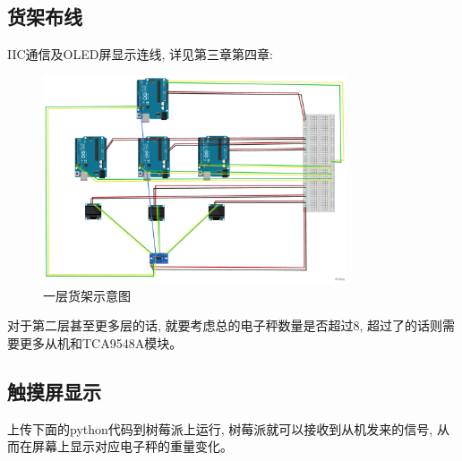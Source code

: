 \documentclass{article}
\begin{document}
\newpage
\subsection{货架布线}
IIC通信及OLED屏显示连线, 详见第三章第四章:
\begin{figure}[h]
  \centering
  \includegraphics[width=0.8\textwidth]{../4_Chapter4_COMMUNICATION/Picture/一层货架示意图.pdf}
  \caption{一层货架示意图}
  \label{fig:一层货架示意图}
\end{figure}

对于第二层甚至更多层的话, 就要考虑总的电子秤数量是否超过8, 超过了的话则需要更多从机和TCA9548A模块。

\subsection{触摸屏显示}
上传下面的python代码到树莓派上运行, 树莓派就可以接收到从机发来的信号, 从而在屏幕上显示对应电子秤的重量变化。
\end{document}
